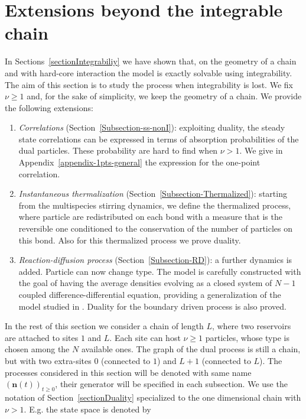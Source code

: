 \documentclass[10pt]{article}
\numberwithin{equation}{section}
\numberwithin{equation}{subsection}
\begin{document}
\section{Extensions beyond the integrable chain}
\label{sec5}
In Sections~\ref{sectionIntegrabiliy} we have shown that, on the geometry of a chain and with hard-core interaction the model is exactly solvable using integrability.  
The aim of this section is to study the process when integrability is lost. We fix $\nu\geq 1$ and, for the sake of simplicity, we keep the geometry of a chain. We provide the following extensions: 
\begin{enumerate}
	\item \textit{Correlations} (Section~\ref{Subsection-ss-nonI}): exploiting duality, the steady state correlations can be expressed in terms of absorption probabilities of the dual particles. These probability are hard to find when $\nu>1$. We give 
	in Appendix~\ref{appendix-1pts-general} the expression for the one-point correlation.
	\item \textit{Instantaneous thermalization} (Section~\ref{Subsection-Thermalized}): starting from the multispecies stirring dynamics, we define the thermalized process, where particle are redistributed on each bond with a measure that is the reversible one conditioned to the conservation of the number of particles on this bond. Also for this thermalized process we prove duality. 	
	\item \textit{Reaction-diffusion process} (Section~\ref{Subsection-RD}): a further dynamics is added. Particle can now change type. The model is carefully constructed with the goal of having the average densities evolving as a closed system of $N-1$ coupled difference-differential equation, providing a generalization of the model studied in \cite{casini2022uphill}. Duality for the boundary driven process is also proved.
\end{enumerate}
In the rest of this section we consider a chain of length $L$, where two reservoirs are attached to sites $1$ and $L$. Each site can host $\nu\geq 1$ particles, whose type is chosen among the $N$ available ones. The graph of the dual process is still a chain, but with two extra-sites $0$ (connected to $1$) and $L+1$ (connected to $L$). The processes considered in this section will be denoted with same name $\left(\bm{n}(t)\right)_{t\geq0}$, their generator will be specified in each subsection. 
We use the notation of Section~\ref{sectionDuality} specialized to the one dimensional chain with $\nu >1$.
E.g. the state space is denoted by 
\end{document}
